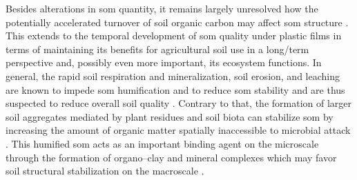 Besides alterations in \ac{som} quantity, it remains largely unresolved how the potentially accelerated turnover of soil organic carbon may affect \ac{som} structure \citep{DiaconoLongterm2010}. This extends to the temporal development of \ac{som} quality under plastic films in terms of maintaining its benefits for agricultural soil use in a long\-/term perspective \citep{DoranDefining1994} and, possibly even more important, its ecosystem functions. In general, the rapid soil respiration and mineralization, soil erosion, and leaching \citep{BolanDissolved2011} are known to impede \ac{som} humification and to reduce \ac{som} stability \citep{SollinsStabilization1996} and are thus suspected to reduce overall soil quality \citep{LalChallenges2009}. Contrary to that, the formation of larger soil aggregates mediated by plant residues and soil biota can stabilize \ac{som} by increasing the amount of organic matter spatially inaccessible to microbial attack \citep{SollinsStabilization1996,vonLutzowStabilization2006}. This humified \ac{som} acts as an important binding agent on the microscale through the formation of organo--clay and mineral complexes which may favor soil structural stabilization on the macroscale \citep{BronickSoil2005,ZhangEffects2015}.

